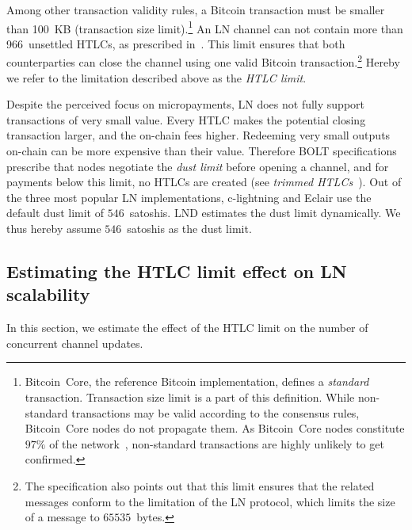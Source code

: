 Among other transaction validity rules, a Bitcoin transaction must be smaller than 100~KB (transaction size limit\cite{StandardTxBitcoinSE, BitcoinCoreMaxTxWeight}).\footnote{Bitcoin~Core, the reference Bitcoin implementation, defines a \textit{standard} transaction. Transaction size limit is a part of this definition. While non-standard transactions may be valid according to the consensus rules, Bitcoin~Core nodes do not propagate them. As Bitcoin~Core nodes constitute $97\%$ of the network~\cite{CoinDance}, non-standard transactions are highly unlikely to get confirmed.}
An LN channel can not contain more than 966~unsettled HTLCs, as prescribed in~\cite{BOLT2Rationale}.
This limit ensures that both counterparties can close the channel using one valid Bitcoin transaction.\footnote{The specification also points out that this limit ensures that the related messages conform to the limitation of the LN protocol, which limits the size of a message to $65535$~bytes.}
Hereby we refer to the limitation described above as the \textit{HTLC limit}.

Despite the perceived focus on micropayments, LN does not fully support transactions of very small value.
Every HTLC makes the potential closing transaction larger, and the on-chain fees higher.
Redeeming very small outputs on-chain can be more expensive than their value.
Therefore BOLT specifications prescribe that nodes negotiate the \textit{dust limit} before opening a channel, and for payments below this limit, no HTLCs are created (see \textit{trimmed HTLCs}~\cite{BOLT3Trimmed}).
Out of the three most popular LN implementations, c-lightning and Eclair use the default dust limit of $546$~satoshis.
LND estimates the dust limit dynamically.
We thus hereby assume $546$~satoshis as the dust limit.



\subsection{Estimating the HTLC limit effect on LN scalability}	\label{estimating-concurrent channel updates}

In this section, we estimate the effect of the HTLC limit on the number of concurrent channel updates.

